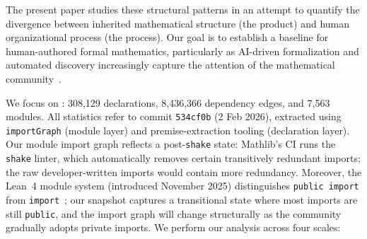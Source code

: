 The present paper studies these structural patterns in an attempt to quantify the divergence between inherited mathematical structure (the product) and human organizational process (the process). Our goal is to establish a baseline for human-authored formal mathematics, particularly as AI-driven formalization and automated discovery increasingly capture the attention of the mathematical community~\cite{hubert2025alphaproof,achim2025aristotle,chen2025seedprover,xin2025deepseekprover}. 

We focus on : 308,129 declarations, 8,436,366 dependency edges, and 7,563 modules. All statistics refer to commit \texttt{534cf0b} (2 Feb 2026), extracted using \texttt{importGraph} (module layer) and premise-extraction tooling (declaration layer). Our module import graph reflects a post-\texttt{shake} state: Mathlib's CI runs the \texttt{shake} linter, which automatically removes certain transitively redundant imports; the raw developer-written imports would contain more redundancy. Moreover, the Lean~4 module system (introduced November 2025) distinguishes \texttt{public import} from \texttt{import}~\cite{lean4modules}; our snapshot captures a transitional state where most imports are still \texttt{public}, and the import graph will change structurally as the community gradually adopts private imports. We perform our analysis across four scales:

